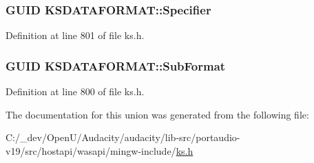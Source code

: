 \subsubsection[{\texorpdfstring{Specifier}{Specifier}}]{\setlength{\rightskip}{0pt plus 5cm}G\+U\+ID K\+S\+D\+A\+T\+A\+F\+O\+R\+M\+A\+T\+::\+Specifier}\hypertarget{union_k_s_d_a_t_a_f_o_r_m_a_t_a05a04e431afcc9d5a007bce301156c8c}{}\label{union_k_s_d_a_t_a_f_o_r_m_a_t_a05a04e431afcc9d5a007bce301156c8c}


Definition at line 801 of file ks.\+h.

\subsubsection[{\texorpdfstring{Sub\+Format}{SubFormat}}]{\setlength{\rightskip}{0pt plus 5cm}G\+U\+ID K\+S\+D\+A\+T\+A\+F\+O\+R\+M\+A\+T\+::\+Sub\+Format}\hypertarget{union_k_s_d_a_t_a_f_o_r_m_a_t_a58a48636b6942b0f4676ee0861ea6386}{}\label{union_k_s_d_a_t_a_f_o_r_m_a_t_a58a48636b6942b0f4676ee0861ea6386}


Definition at line 800 of file ks.\+h.



The documentation for this union was generated from the following file\+:\begin{DoxyCompactItemize}
\item 
C\+:/\+\_\+dev/\+Open\+U/\+Audacity/audacity/lib-\/src/portaudio-\/v19/src/hostapi/wasapi/mingw-\/include/\hyperlink{ks_8h}{ks.\+h}\end{DoxyCompactItemize}
